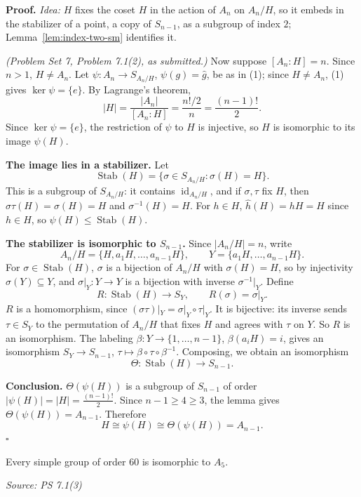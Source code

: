 \documentclass[11pt]{report}
\renewenvironment{proof}[1][Proof]{\noindent\textbf{#1.} }{\hfill$\square$\par\vspace{5pt}}
\newcommand{\srcline}[1]{\par\hfill{\footnotesize\textit{Source: #1}}}
\begin{document}
\begin{proof}
\textit{Idea:} $H$ fixes the coset $H$ in the action of $A_n$ on $A_n/H$, so it embeds in the stabilizer of a point, a copy of $S_{n-1}$, as a subgroup of index $2$; Lemma~\ref{lem:index-two-sm} identifies it.\par
\textit{(Problem Set 7, Problem 7.1(2), as submitted.)} Now suppose $[A_n : H] = n$. Since $n > 1$, $H \neq A_n$. Let $\psi \colon A_n \to S_{A_n/H}$, $\psi(g) = \hat g$, be as in (1); since $H \neq A_n$, (1) gives $\ker\psi = \{e\}$. By Lagrange's theorem,
\[
|H| = \frac{|A_n|}{[A_n : H]} = \frac{n!/2}{n} = \frac{(n-1)!}{2}.
\]
Since $\ker\psi = \{e\}$, the restriction of $\psi$ to $H$ is injective, so $H$ is isomorphic to its image $\psi(H)$.

\textbf{The image lies in a stabilizer.} Let
\[
\operatorname{Stab}(H) = \{\sigma \in S_{A_n/H} : \sigma(H) = H\}.
\]
This is a subgroup of $S_{A_n/H}$: it contains $\operatorname{id}_{A_n/H}$, and if $\sigma, \tau$ fix $H$, then $\sigma\tau(H) = \sigma(H) = H$ and $\sigma^{-1}(H) = H$. For $h \in H$, $\hat h(H) = hH = H$ since $h \in H$, so $\psi(H) \leq \operatorname{Stab}(H)$.

\textbf{The stabilizer is isomorphic to $S_{n-1}$.} Since $|A_n/H| = n$, write
\[
A_n/H = \{H, a_1H, \dots, a_{n-1}H\}, \qquad Y = \{a_1H, \dots, a_{n-1}H\}.
\] For $\sigma \in \operatorname{Stab}(H)$, $\sigma$ is a bijection of $A_n/H$ with $\sigma(H) = H$, so by injectivity $\sigma(Y) \subseteq Y$, and $\sigma|_Y \colon Y \to Y$ is a bijection with inverse $\sigma^{-1}|_Y$. Define
\[
R \colon \operatorname{Stab}(H) \to S_Y, \qquad R(\sigma) = \sigma|_Y.
\]
$R$ is a homomorphism, since $(\sigma\tau)|_Y = \sigma|_Y \circ \tau|_Y$. It is bijective: its inverse sends $\tau \in S_Y$ to the permutation of $A_n/H$ that fixes $H$ and agrees with $\tau$ on $Y$. So $R$ is an isomorphism. The labeling $\beta \colon Y \to \{1, \dots, n-1\}$, $\beta(a_iH) = i$, gives an isomorphism $S_Y \to S_{n-1}$, $\tau \mapsto \beta \circ \tau \circ \beta^{-1}$. Composing, we obtain an isomorphism
\[
\Theta \colon \operatorname{Stab}(H) \to S_{n-1}.
\]

\textbf{Conclusion.} $\Theta(\psi(H))$ is a subgroup of $S_{n-1}$ of order $|\psi(H)| = |H| = \frac{(n-1)!}{2}$. Since $n - 1 \geq 4 \geq 3$, the lemma gives $\Theta(\psi(H)) = A_{n-1}$. Therefore
\[
H \cong \psi(H) \cong \Theta(\psi(H)) = A_{n-1}.
\]
\end{proof}

\begin{thmbox}\label{thm:simple-order-60}
Every simple group of order $60$ is isomorphic to $A_5$.
\srcline{PS 7.1(3)}
\end{thmbox}
\end{document}
